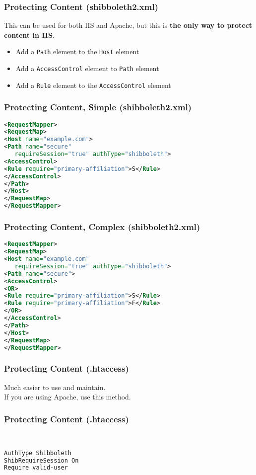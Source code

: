 \begin{frame}
\frametitle{Protecting Content (shibboleth2.xml)}
This can be used for both IIS and Apache, but this is \textbf{the only way to protect content in IIS}.
\begin{itemize}
\item Add a \texttt{Path} element to the \texttt{Host} element 
\item Add a \texttt{AccessControl} element to \texttt{Path} element
\item Add a \texttt{Rule} element to the \texttt{AccessControl} element
\end{itemize}
\end{frame}

\begin{frame}[fragile]
\frametitle{Protecting Content, Simple (shibboleth2.xml)}
\begin{lstlisting}[language=XML,basicstyle=\ttfamily \small]
<RequestMapper>
<RequestMap>
<Host name="example.com">
<Path name="secure" 
   requireSession="true" authType="shibboleth">
<AccessControl>
<Rule require="primary-affiliation">S</Rule>
</AccessControl>
</Path>
</Host>
</RequestMap>
</RequestMapper>
\end{lstlisting}

\end{frame}

\begin{frame}[fragile]
\frametitle{Protecting Content, Complex (shibboleth2.xml)}
\begin{lstlisting}[language=XML,basicstyle=\ttfamily \small]
<RequestMapper>
<RequestMap>
<Host name="example.com" 
   requireSession="true" authType="shibboleth">
<Path name="secure">
<AccessControl>
<OR>
<Rule require="primary-affiliation">S</Rule>
<Rule require="primary-affiliation">F</Rule>
</OR>
</AccessControl>
</Path>
</Host>
</RequestMap>
</RequestMapper>
\end{lstlisting}

\end{frame}

\begin{frame}
\frametitle{Protecting Content (.htaccess)}
Much easier to use and maintain. \\ \bigskip
If you are using Apache, use this method.
\end{frame}

\begin{frame}[fragile]
\frametitle{Protecting Content (.htaccess)}
 \\
\begin{lstlisting}[language=XML,basicstyle=\ttfamily \small]
AuthType Shibboleth
ShibRequireSession On
Require valid-user
\end{lstlisting}
\end{frame}


